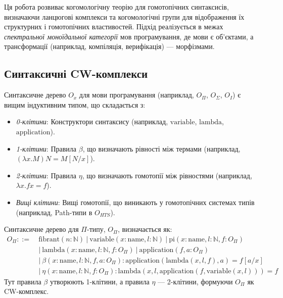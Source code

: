 Ця робота розвиває когомологічну теорію для гомотопічних синтаксисів,
визначаючи ланцюгові комплекси та когомологічні групи для відображення
їх структурних і гомотопічних властивостей. Підхід реалізується в
межах \emph{спектральної моноїдальної категорії} мов програмування,
де мови є об'єктами, а трансформації (наприклад, компіляція, верифікація) — морфізмами.

\subsection{Синтаксичні CW-комплекси}
\begin{definition}
Синтаксичне дерево \( O_x \) для мови програмування (наприклад, \( O_\Pi \),
\( O_\Sigma \), \( O_I \)) є вищим індуктивним типом, що складається з:
\begin{itemize}
    \item \emph{0-клітини}: Конструктори синтаксису (наприклад, \(\text{variable}\), \(\text{lambda}\), \(\text{application}\)).
    \item \emph{1-клітини}: Правила \(\beta\), що визначають рівності між термами (наприклад, \( (\lambda x. M) N = M[N/x] \)).
    \item \emph{2-клітини}: Правила \(\eta\), що визначають гомотопії між рівностями (наприклад, \( \lambda x. f x = f \)).
    \item \emph{Вищі клітини}: Вищі гомотопії, що виникають у гомотопічних системах типів (наприклад, Path-типи в \( O_{HTS} \)).
\end{itemize}
\end{definition}

\begin{example}
Синтаксичне дерево для \(\Pi\)-типу, \( O_\Pi \), визначається як:
\begin{align*}
O_\Pi ::= &\ \text{fibrant}(n: \mathbb{N}) \ | \ \text{variable}(x: \text{name}, l: \mathbb{N}) \ | \ \text{pi}(x: \text{name}, l: \mathbb{N}, f: O_\Pi) \\
&\ | \ \text{lambda}(x: \text{name}, l: \mathbb{N}, f: O_\Pi) \ | \ \text{application}(f, a: O_\Pi) \\
&\ | \ \beta(x: \text{name}, l: \mathbb{N}, f, a: O_\Pi) : \text{application}(\text{lambda}(x, l, f), a) = f[a/x] \\
&\ | \ \eta(x: \text{name}, l: \mathbb{N}, f: O_\Pi) : \text{lambda}(x, l, \text{application}(f, \text{variable}(x, l))) = f
\end{align*}
Тут правила \(\beta\) утворюють 1-клітини, а правила \(\eta\) — 2-клітини, формуючи \( O_\Pi \) як CW-комплекс.
\end{example}

